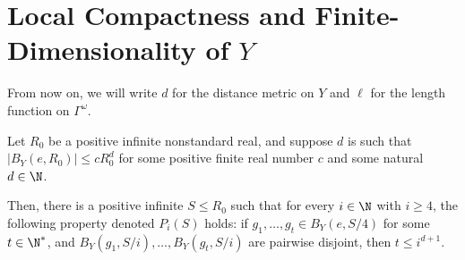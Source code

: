 \documentclass[10pt]{mypackage}
\begin{document}
\section{Local Compactness and Finite-Dimensionality of $Y$}%
From now on, we will write $d$ for the distance metric on $Y$ and $\ell$ for the length function on $\Gamma^{\omega}$.
\begin{lemma}
  Let $R_0$ be a positive infinite nonstandard real, and suppose $d$ is such that $\left\vert B_{Y}\left( e,R_0 \right) \right\vert \leq cR_0^{d}$ for some positive finite real number $c$ and some natural $d\in \N$.

  Then, there is a positive infinite $S\leq R_0$ such that for every $i\in \N$ with $i\geq 4$, the following property denoted $P_i(S)$ holds: if $g_1,\dots,g_t\in B_{Y}\left( e,S/4 \right)$ for some $t\in \N^{\ast}$, and $B_{Y}\left( g_1,S/i \right),\dots,B_Y\left( g_t,S/i \right)$ are pairwise disjoint, then $t\leq i^{d+1}$.
\end{lemma}
\end{document}
